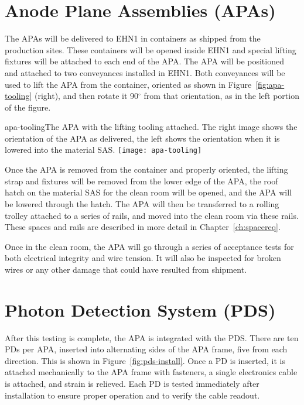  
\section{Anode Plane Assemblies (APAs)}

The APAs will be delivered to EHN1 in containers as shipped from the production sites.  These containers will be opened inside EHN1 and special lifting fixtures will be attached to each end of the APA.  The APA will be positioned and attached to two conveyances installed in EHN1.  Both conveyances will be used to lift the APA from the container, oriented as shown in Figure~\ref{fig:apa-tooling} (right), and then rotate it 90$^\circ$ from that orientation, as in the left portion of the figure.

\begin{cdrfigure}{apa-tooling}{The APA with the lifting tooling attached.  The right image shows the orientation of the APA as delivered, the left shows the orientation when it is lowered into the material SAS. }
\texttt{[image: apa-tooling]}
\end{cdrfigure}

Once the APA is removed from the container and properly oriented, the lifting strap and fixtures will be removed from the lower edge of the APA, the roof hatch on the material SAS for 
 the clean room will be opened, and the APA will be lowered through the hatch.  The APA will then be transferred to a rolling trolley attached to a series of rails, and moved into the clean room via these rails.  These spaces and rails are described in more detail in Chapter~\ref{ch:spacereq}. 

Once in the clean room, the APA will go through a series of acceptance tests for both electrical integrity and wire tension.  It will also be inspected for broken wires or any other damage that could have resulted from shipment.  

\section{Photon Detection System (PDS)}

After this testing is complete, the APA is integrated with the PDS.  There are ten PDs per APA, inserted into alternating sides of the APA frame, %
five from each direction.  This is shown in Figure~\ref{fig:pds-install}.  Once a PD is inserted, it is attached mechanically to the APA frame with fasteners, a single electronics cable is attached, and strain is relieved.  Each PD is tested immediately after installation to ensure proper operation and to verify the cable readout.  

